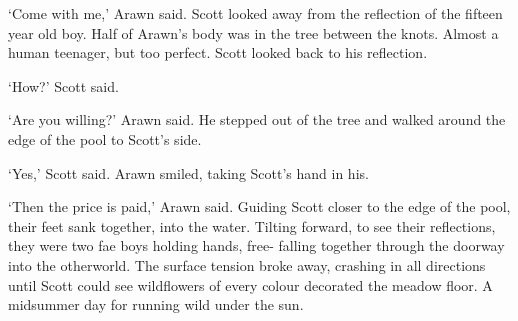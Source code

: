 `Come with me,' Arawn said. Scott looked away from the reflection of
the fifteen year old boy. Half of Arawn's body was in the tree between
the knots. Almost a human teenager, but too perfect. Scott looked back
to his reflection.

`How?' Scott said.

`Are you willing?' Arawn said. He stepped out of the tree and walked
around the edge of the pool to Scott's side.

`Yes,' Scott said. Arawn smiled, taking Scott's hand in his.

`Then the price is paid,' Arawn said. Guiding Scott closer to the
edge of the pool, their feet sank together, into the water. Tilting
forward, to see their reflections, they were two fae boys holding hands, free-%
falling together through the doorway into the otherworld. The surface
tension broke away, crashing in all directions until Scott could see
wildflowers of every colour decorated the meadow floor. A midsummer
day for running wild under the sun.


